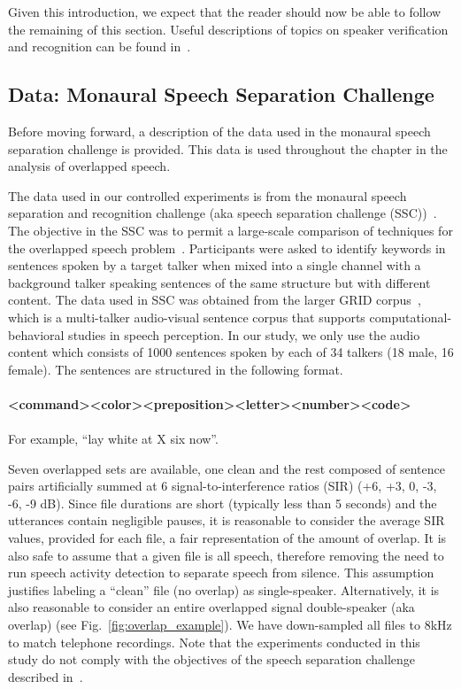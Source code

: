 Given this introduction, we expect that the reader should now be able to follow the remaining of this section. 
Useful descriptions of topics on speaker verification and recognition can be found in~\cite{niko_thesis,taufiq_magazine}. 

\newpage
\subsection{Data: Monaural Speech Separation Challenge}
\label{ssec:data}
Before moving forward, a description of the data used in the monaural speech separation challenge is provided. 
This data is used throughout the chapter in the analysis of overlapped speech. 

The data used in our controlled experiments is from the monaural speech separation and recognition challenge (aka speech separation challenge (SSC))~\cite{cooke20101}. 
The objective in the SSC was to permit a large-scale comparison of techniques for the overlapped speech problem~\cite{cooke20101}. 
Participants were asked to identify keywords in sentences spoken by a target talker when mixed into a single channel with a background talker speaking sentences of the same structure but with different content. 
The data used in SSC was obtained from the larger GRID corpus~\cite{cooke_JASA_SSCD}, which is a multi-talker audio-visual sentence corpus that supports computational-behavioral studies in speech perception. 
In our study, we only use the audio content which consists of 1000 sentences spoken by each of 34 talkers (18 male, 16 female). The sentences are structured in the following format.
\\\\
{\small \bf \textless command\textgreater\textless color\textgreater\textless preposition\textgreater\textless letter\textgreater\textless number\textgreater\textless code\textgreater}
\\\\
For example, ``lay white at X six now''.

Seven overlapped sets are available, one clean and the rest composed of sentence pairs artificially summed at 6 signal-to-interference ratios (SIR) (+6, +3, 0, -3, -6, -9 dB). 
Since file durations are short (typically less than 5 seconds) and the utterances contain negligible pauses, it is reasonable to consider the average SIR values, provided for each file, a fair representation of the amount of overlap. 
It is also safe to assume that a given file is all speech, therefore removing the need to run speech activity detection to separate speech from silence. 
This assumption justifies labeling a ``clean'' file (no overlap) as single-speaker. 
Alternatively, it is also reasonable to consider an entire overlapped signal double-speaker (aka overlap) (see Fig.~\ref{fig:overlap_example}). 
We have down-sampled all files to 8kHz to match telephone recordings. 
Note that the experiments conducted in this study do not comply with the objectives of the speech separation challenge described in~\cite{SSC_link}. 

